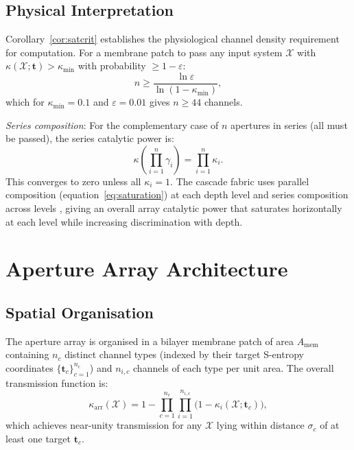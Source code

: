 \documentclass[11pt,twocolumn,a4paper]{article}
\theoremstyle{definition}
\theoremstyle{remark}
\newcommand{\kap}{\kappa}
\begin{document}
\subsection{Physical Interpretation}

Corollary~\ref{cor:satcrit} establishes the physiological channel density
requirement for computation. For a membrane patch to pass any input system
$\mathcal{X}$ with $\kap(\mathcal{X}; \mathbf{t}) > \kap_{\min}$ with
probability $\geq 1 - \varepsilon$:
\begin{equation}
n \geq \frac{\ln \varepsilon}{\ln(1 - \kap_{\min})},
\label{eq:density}
\end{equation}
which for $\kap_{\min} = 0.1$ and $\varepsilon = 0.01$ gives $n \geq 44$ channels.

\textit{Series composition}: For the complementary case of $n$ apertures in
series (all must be passed), the series catalytic power is:
\begin{equation}
\kap\!\left(\prod_{i=1}^n \gamma_i\right) = \prod_{i=1}^n \kap_i.
\label{eq:series}
\end{equation}
This converges to zero unless all $\kap_i = 1$. The cascade fabric uses
parallel composition (equation~\eqref{eq:saturation}) at each depth level
and series composition across levels \citep{companion5}, giving an overall
array catalytic power that saturates horizontally at each level while
increasing discrimination with depth.



\section{Aperture Array Architecture}
\label{sec:array}

\subsection{Spatial Organisation}

The aperture array is organised in a bilayer membrane patch of area
$A_{\mathrm{mem}}$ containing $n_c$ distinct channel types (indexed by their
target S-entropy coordinates $\{\mathbf{t}_c\}_{c=1}^{n_c}$) and $n_{i,c}$
channels of each type per unit area. The overall transmission function is:
\begin{equation}
\kap_{\mathrm{arr}}(\mathcal{X}) = 1 - \prod_{c=1}^{n_c} \prod_{i=1}^{n_{i,c}}
\bigl(1 - \kap_i(\mathcal{X}; \mathbf{t}_c)\bigr),
\label{eq:arrayproduct}
\end{equation}
which achieves near-unity transmission for any $\mathcal{X}$ lying within
distance $\sigma_c$ of at least one target $\mathbf{t}_c$.
\end{document}
